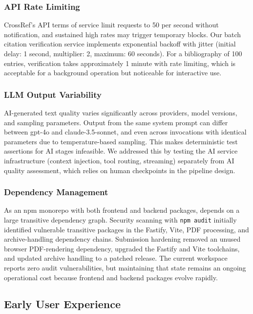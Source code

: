 \subsubsection{API Rate Limiting}

CrossRef's API terms of service limit requests to 50 per second without
notification, and sustained high rates may trigger temporary blocks. Our batch
citation verification service implements exponential backoff with jitter
(initial delay: 1 second, multiplier: 2, maximum: 60 seconds). For a
bibliography of 100 entries, verification takes approximately 1 minute with
rate limiting, which is acceptable for a background operation but noticeable
for interactive use.

\subsubsection{LLM Output Variability}

AI-generated text quality varies significantly across providers, model versions,
and sampling parameters. Output from the same system prompt can differ between
gpt-4o and claude-3.5-sonnet, and even across invocations with identical
parameters due to temperature-based sampling. This makes deterministic test
assertions for AI stages infeasible. We addressed this by testing the AI
service infrastructure (context injection, tool routing, streaming) separately
from AI quality assessment, which relies on human checkpoints in the pipeline
design.

\subsubsection{Dependency Management}

As an npm monorepo with both frontend and backend packages, \software{} depends
on a large transitive dependency graph. Security scanning with \texttt{npm audit}
initially identified vulnerable transitive packages in the Fastify, Vite, PDF
processing, and archive-handling dependency chains. Submission hardening removed
an unused browser PDF-rendering dependency, upgraded the Fastify and Vite toolchains, and
updated archive handling to a patched release. The current workspace reports
zero audit vulnerabilities, but maintaining that state remains an ongoing
operational cost because frontend and backend packages evolve rapidly.



\subsection{Early User Experience}

